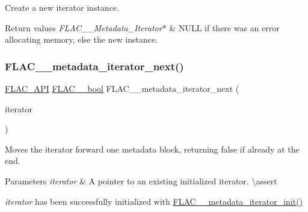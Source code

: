 Create a new iterator instance.


\begin{DoxyRetVals}{Return values}
{\em F\+L\+A\+C\+\_\+\+\_\+\+Metadata\+\_\+\+Iterator$\ast$} & {\ttfamily N\+U\+LL} if there was an error allocating memory, else the new instance. \\
\hline
\end{DoxyRetVals}
\mbox{\label{group__flac__metadata__level2_ga3997509ae7eeea3b208700cdbbbd97ed}} 
\subsubsection{\texorpdfstring{FLAC\_\_metadata\_iterator\_next()}{FLAC\_\_metadata\_iterator\_next()}}
{\footnotesize\ttfamily \mbox{\hyperlink{group__flac__export_ga56ca07df8a23310707732b1c0007d6f5}{F\+L\+A\+C\+\_\+\+A\+PI}} \mbox{\hyperlink{ordinals_8h_a95103469f1cbd78b8cf250194985b34e}{F\+L\+A\+C\+\_\+\+\_\+bool}} F\+L\+A\+C\+\_\+\+\_\+metadata\+\_\+iterator\+\_\+next (\begin{DoxyParamCaption}\item[{\mbox{\hyperlink{group__flac__metadata__level2_ga9f3e135a07cdef7e51597646aa7b89b2}{F\+L\+A\+C\+\_\+\+\_\+\+Metadata\+\_\+\+Iterator}} $\ast$}]{iterator }\end{DoxyParamCaption})}

Moves the iterator forward one metadata block, returning {\ttfamily false} if already at the end.


\begin{DoxyParams}{Parameters}
{\em iterator} & A pointer to an existing initialized iterator. \textbackslash{}assert 
\begin{DoxyCode}{1}
\end{DoxyCode}
 {\itshape iterator} has been successfully initialized with \mbox{\hyperlink{group__flac__metadata__level2_ga4a5af69a1f19436b02f738eb8c97c959}{F\+L\+A\+C\+\_\+\+\_\+metadata\+\_\+iterator\+\_\+init()}} \\
\hline
\end{DoxyParams}

